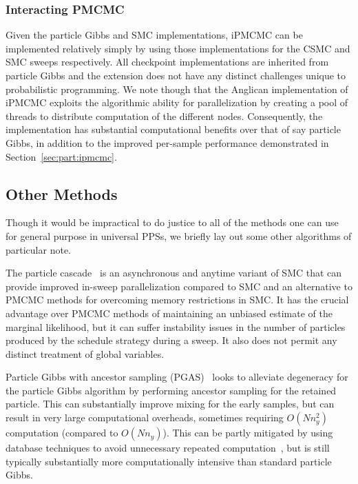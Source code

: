 \subsubsection{Interacting PMCMC}
\label{sec:proginf:str:part:ipmcmc}

Given the particle Gibbs and SMC implementations, iPMCMC can be implemented
relatively simply by using those implementations for the CSMC and SMC sweeps respectively.
All checkpoint implementations are inherited from particle Gibbs and the extension does
not have any distinct challenges unique to probabilistic programming.  We note though that
the Anglican implementation of iPMCMC exploits the algorithmic ability for parallelization 
by creating a pool of threads to distribute computation of the different nodes.   Consequently,
the implementation has substantial computational benefits over that of say particle Gibbs, in addition
to the improved per-sample performance demonstrated in Section~\ref{sec:part:ipmcmc}.

\subsection{Other Methods}
\label{sec:proginf:str:part:other}

Though it would be impractical to do justice to all of the methods one can use for general
purpose in universal PPSs, we briefly lay out some other algorithms of particular note.

The particle cascade~\citep{paige2014asynchronous} is an asynchronous and anytime
	variant of SMC that can provide improved in-sweep parallelization compared to SMC
	and an alternative to PMCMC methods for overcoming memory restrictions in
	SMC.  It has the crucial advantage over PMCMC methods of maintaining an unbiased estimate
	of the marginal likelihood, but it can suffer instability issues in the number of particles produced
	by the schedule strategy during a sweep. It also does not permit any distinct treatment of global
	variables.

Particle Gibbs with ancestor sampling (PGAS)~\citep{lindstenJS2014,vandemeent_aistats_2015}
	looks to alleviate degeneracy for the particle Gibbs algorithm by performing ancestor sampling
	for the retained particle.  This can substantially improve mixing for the early samples, but can
	result in very large computational overheads, sometimes requiring $O(Nn_y^2)$ computation
	(compared to $O(Nn_y)$).  This can be partly 
	mitigated by using database techniques to avoid unnecessary
	repeated computation~\citep{vandemeent_aistats_2015}, but is still typically substantially more computationally intensive than
	standard particle Gibbs.  

